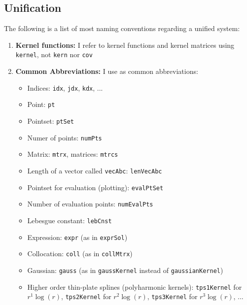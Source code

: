 \documentclass[12pt]{article}
\begin{document}
\subsection{Unification}
The following is a list of most naming conventions regarding a unified system:
\begin{enumerate}
\item \textbf{Kernel functions:} I refer to kernel functions and kernel matrices using \texttt{kernel}, not \texttt{kern} nor \texttt{cov}
\item \textbf{Common Abbreviations:} I use as common abbreviations:
\begin{itemize}
\item Indices: \texttt{idx}, \texttt{jdx}, \texttt{kdx}, ...
\item Point: \texttt{pt}
\item Pointset: \texttt{ptSet}
\item Numer of points: \texttt{numPts}
\item Matrix: \texttt{mtrx}, matrices: \texttt{mtrcs}
\item Length of a vector called \texttt{vecAbc}: \texttt{lenVecAbc}
\item Pointset for evaluation (plotting): \texttt{evalPtSet}
\item Number of evaluation points: \texttt{numEvalPts}
\item Lebesgue constant: \texttt{lebCnst}
\item Expression: \texttt{expr} (as in \texttt{exprSol}) 
\item Collocation: \texttt{coll} (as in \texttt{collMtrx}) 
\item Gaussian: \texttt{gauss} (as in \texttt{gaussKernel} instead of \texttt{gaussianKernel})
\item Higher order thin-plate splines (polyharmonic kernels): \texttt{tps1Kernel} for $r^1\log(r)$, \texttt{tps2Kernel} for $r^2\log(r)$, \texttt{tps3Kernel} for $r^3\log(r)$, ...
\end{itemize}
\end{enumerate}
\end{document}

